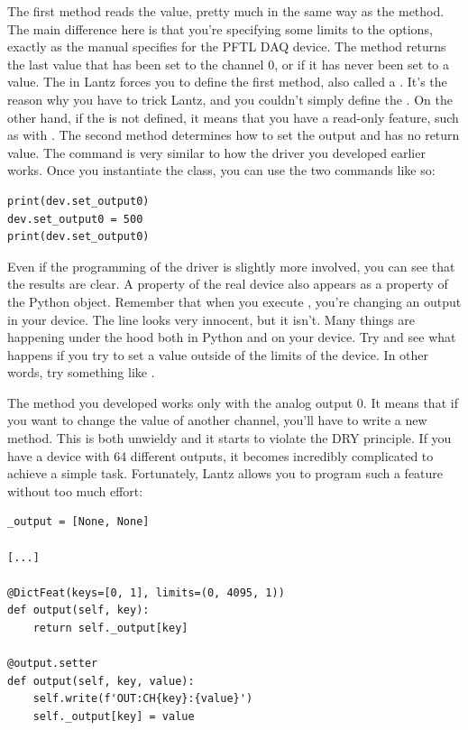 The first method reads the value, pretty much in the same way as the  method. The main difference here is that you're specifying some limits to the options, exactly as the manual specifies for the {PFTL DAQ} device. The method  returns the last value that has been set to the channel 0, or  if it has never been set to a value. The  in Lantz forces you to define the first method, also called a . It's the reason why you have to trick Lantz, and you couldn't simply define the . On the other hand, if the  is not defined, it means that you have a read-only feature, such as with . The second method determines how to set the output and has no return value. The command is very similar to how the driver you developed earlier works. Once you instantiate the class, you can use the two commands like so:

\begin{verbatim}
print(dev.set_output0)
dev.set_output0 = 500
print(dev.set_output0)
\end{verbatim}

Even if the programming of the driver is slightly more involved, you can see that the results are clear. A property of the real device also appears as a property of the Python object. Remember that when you execute , you're changing an output in your device. The line looks very innocent, but it isn't. Many things are happening under the hood both in Python and on your device. Try and see what happens if you try to set a value outside of the limits of the device. In other words, try something like .

The method you developed works only with the analog output 0. It means that if you want to change the value of another channel, you'll have to write a new method. This is both unwieldy and it starts to violate the DRY principle. If you have a device with 64 different outputs, it becomes incredibly complicated to achieve a simple task. Fortunately, Lantz allows you to program such a feature without too much effort:

\begin{verbatim}
_output = [None, None]

[...]

@DictFeat(keys=[0, 1], limits=(0, 4095, 1))
def output(self, key):
    return self._output[key]

@output.setter
def output(self, key, value):
    self.write(f'OUT:CH{key}:{value}')
    self._output[key] = value
\end{verbatim}

